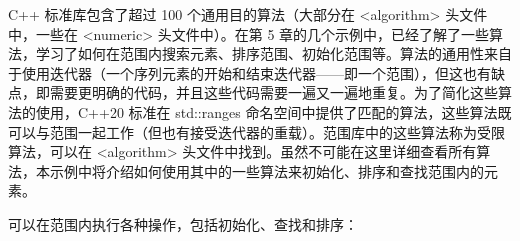 

C++ 标准库包含了超过 100 个通用目的算法（大部分在 <algorithm> 头文件中，一些在 <numeric> 头文件中）。在第 5 章的几个示例中，已经了解了一些算法，学习了如何在范围内搜索元素、排序范围、初始化范围等。算法的通用性来自于使用迭代器（一个序列元素的开始和结束迭代器——即一个范围），但这也有缺点，即需要更明确的代码，并且这些代码需要一遍又一遍地重复。为了简化这些算法的使用，C++20 标准在 std::ranges 命名空间中提供了匹配的算法，这些算法既可以与范围一起工作（但也有接受迭代器的重载）。范围库中的这些算法称为受限算法，可以在 <algorithm> 头文件中找到。虽然不可能在这里详细查看所有算法，本示例中将介绍如何使用其中的一些算法来初始化、排序和查找范围内的元素。



可以在范围内执行各种操作，包括初始化、查找和排序：

